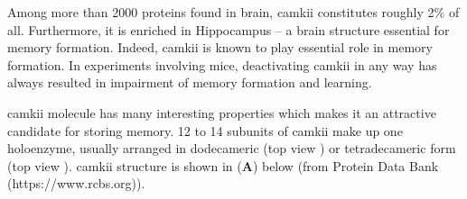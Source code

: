 \documentclass[]{resonance}
\begin{document}
 {
Among more than 2000 proteins found in brain, \gls{camkii} constitutes roughly
2\% of all. Furthermore, it is enriched in Hippocampus -- a brain structure
essential for memory formation. Indeed, \gls{camkii} is known to play essential
role in memory formation. In experiments involving mice, deactivating
\gls{camkii} in any way has always resulted in impairment of memory formation
and learning. 

\gls{camkii} molecule has many interesting properties which makes it an
attractive candidate for storing memory. 12 to 14 subunits of \gls{camkii} make
up one holoenzyme, usually arranged in dodecameric (top view ) or tetradecameric form (top view ). \gls{camkii}
structure is shown in (\textbf{A}) below (from Protein Data Bank
(https://www.rcbs.org)).

\vspace{5mm}
}
\end{document}
